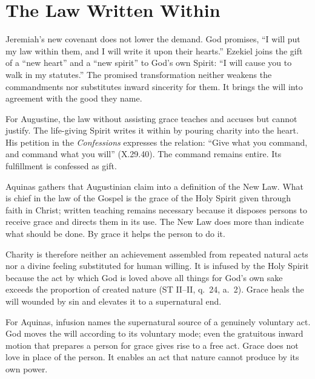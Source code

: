\section{The Law Written Within}

Jeremiah's new covenant does not lower the demand. God promises, ``I will put my law within them, and I will write it upon their hearts.'' Ezekiel joins the gift of a ``new heart'' and a ``new spirit'' to God's own Spirit: ``I will cause you to walk in my statutes.'' The promised transformation neither weakens the commandments nor substitutes inward sincerity for them. It brings the will into agreement with the good they name.

For Augustine, the law without assisting grace teaches and accuses but cannot justify. The life-giving Spirit writes it within by pouring charity into the heart. His petition in the \emph{Confessions} expresses the relation: ``Give what you command, and command what you will'' (X.29.40). The command remains entire. Its fulfillment is confessed as gift.

Aquinas gathers that Augustinian claim into a definition of the New Law. What is chief in the law of the Gospel is the grace of the Holy Spirit given through faith in Christ; written teaching remains necessary because it disposes persons to receive grace and directs them in its use. The New Law does more than indicate what should be done. By grace it helps the person to do it.

Charity is therefore neither an achievement assembled from repeated natural acts nor a divine feeling substituted for human willing. It is infused by the Holy Spirit because the act by which God is loved above all things for God's own sake exceeds the proportion of created nature (ST II--II, q.~24, a.~2). Grace heals the will wounded by sin and elevates it to a supernatural end.

For Aquinas, infusion names the supernatural source of a genuinely voluntary act. God moves the will according to its voluntary mode; even the gratuitous inward motion that prepares a person for grace gives rise to a free act. Grace does not love in place of the person. It enables an act that nature cannot produce by its own power.

